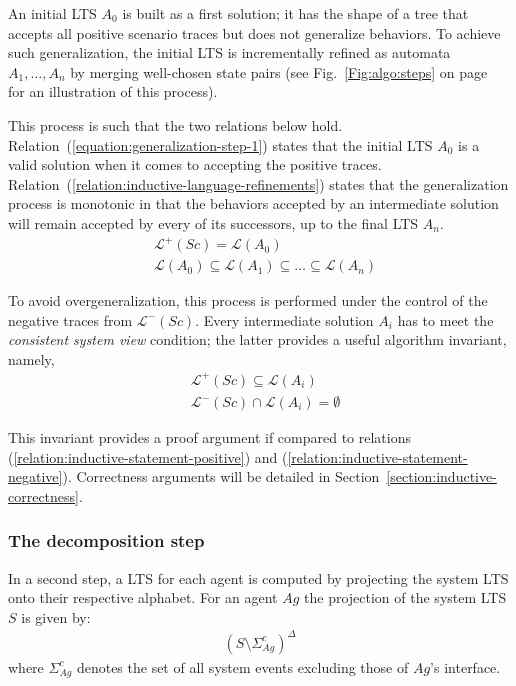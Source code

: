 An initial LTS $A_0$ is built as a first solution; it has the shape of a tree that accepts all positive scenario traces but does not generalize behaviors. To achieve such generalization, the initial LTS is incrementally refined as automata $A_1,\ldots,A_n$ by merging well-chosen state pairs (see Fig.~\ref{Fig:algo:steps} on page~\pageref{Fig:algo:steps} for an illustration of this process).

This process is such that the two relations below hold. Relation~(\ref{equation:generalization-step-1}) states that the initial LTS $A_0$ is a valid solution when it comes to accepting the positive traces. Relation~(\ref{relation:inductive-language-refinements}) states that the generalization process is monotonic in that the behaviors accepted by an intermediate solution will remain accepted by every of its successors, up to the final LTS $A_n$.
\begin{align}
&\mathcal{L}^+(Sc) = \mathcal{L}(A_0) \label{equation:generalization-step-1}\\
&\mathcal{L}(A_0) \subseteq \mathcal{L}(A_1) \subseteq \ldots \subseteq \mathcal{L}(A_n)
\label{relation:inductive-language-refinements}
\end{align}

To avoid overgeneralization, this process is performed under the control of the negative traces from $\mathcal{L}^-(Sc)$. Every intermediate solution $A_i$ has to meet the \emph{consistent system view} condition; the latter provides a useful algorithm invariant, namely,
\begin{align}
&\mathcal{L}^+(Sc) \subseteq \mathcal{L}(A_i)        \label{relation:inductive-invariant}\\
&\mathcal{L}^-(Sc) \cap \mathcal{L}(A_i) = \emptyset \label{relation:inductive-invariant-II}
\end{align}

This invariant provides a proof argument if compared to relations (\ref{relation:inductive-statement-positive}) and (\ref{relation:inductive-statement-negative}). Correctness arguments will be detailed in Section~\ref{section:inductive-correctness}.

\subsubsection*{The decomposition step}

In a second step, a LTS for each agent is computed by projecting the system LTS onto their respective alphabet. For an agent $Ag$ the projection of the system LTS $S$ is given by:
\begin{align}
(S \setminus \Sigma_{Ag}^c)^\Delta
\label{definition:decomposition-step}
\end{align}
\noindent where $\Sigma_{Ag}^c$ denotes the set of all system events excluding those of $Ag$'s interface.

